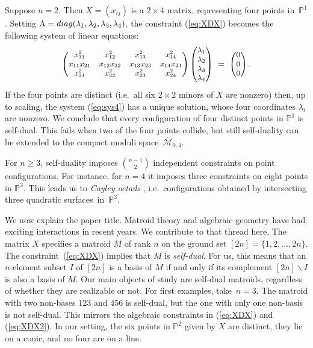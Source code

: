 \documentclass[12pt]{extarticle}
\theoremstyle{definition}
\numberwithin{theorem}{section}
\theoremstyle{plain}\newtheorem{ithm}{Theorem}
\newcommand{\PP}{\mathbb{P}}
\begin{document}
Suppose $n=2$. Then
$X = (x_{ij})$ is a $2 \times 4$ matrix, representing four points in~$\PP^1$.
Setting
$\Lambda = {\rm diag}(\lambda_1,\lambda_2,\lambda_3,\lambda_4)$, the constraint (\ref{eq:XDX})
becomes the following system of linear equations:
\begin{equation} 
\label{eq:sys4}
\begin{small}
\begin{pmatrix} 
x_{11}^2 & x_{12}^2 & x_{13}^2 & x_{14}^2 \\
x_{11} x_{21} & x_{12} x_{22} & x_{13} x_{23} & x_{14} x_{24} \\
x_{21}^2 & x_{22}^2 & x_{23}^2 & x_{24}^2 
\end{pmatrix} \begin{pmatrix} \lambda_1 \\ \lambda_2 \\ \lambda_3 \\ \lambda_4 \end{pmatrix} \,\, = \,\,
\begin{pmatrix} 0 \\ 0 \\ 0 \end{pmatrix} . \end{small}
\end{equation}
If the four points are distinct (i.e.~all six $2 \times 2$ minors of $X$ are nonzero) then,
up to scaling, the system
 (\ref{eq:sys4}) has a unique solution, whose four
coordinates $\lambda_i$ are nonzero.
We conclude that every configuration of four distinct points in $\PP^1$ is self-dual. This fails when two of 
the four points collide, but still self-duality can be extended  to the compact moduli space~$\overline{\mathcal{M}}_{0,4}$. 


For $n \geq 3$, self-duality imposes $\binom{n-1}{2}$ independent constraints on
point configurations. For instance, for $n=4$ it imposes three constraints on
eight points in $\PP^3$. This leads us to
  {\em Cayley octads} \cite{DO, PSV}, i.e.~configurations obtained by
  intersecting three quadratic surfaces~in~$\PP^3$.

We now explain the paper title.
Matroid theory and algebraic geometry have had  exciting
interactions in recent years. We contribute to
that thread here. The matrix $X$ specifies a matroid $M$ of rank $n$
on the ground set $[2n] = \{1,2,\ldots,2n\}$.
The constraint~(\ref{eq:XDX}) implies that $M$ is {\em self-dual}.
For us, this means that an $n$-element subset $I$ of $[2n]$ is a basis of $M$ 
if and only if its  complement $[2n] \backslash I$ is also a basis of $M$.
Our main objects of study  are
 self-dual matroids, regardless of whether they are
realizable or not. For first examples, take~$n=3$.  The matroid with two non-bases $123$ and $456$ is self-dual,
but the one with only one non-basis is not self-dual.
This mirrors the algebraic constraints in  (\ref{eq:XDX}) and  (\ref{eq:XDX2}). In our setting,
the six points in $\PP^2$ given by $X$ are distinct, they lie on a conic, and
no four are on a line.  
\end{document}
